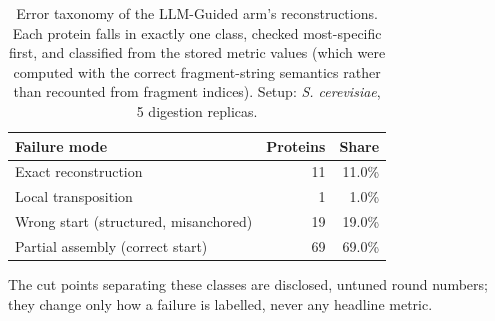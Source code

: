 \begin{table}[!tb]
  \centering
  \caption{Error taxonomy of the LLM-Guided arm's reconstructions. Each protein falls in exactly one class, checked most-specific first, and classified from the stored metric values (which were computed with the correct fragment-string semantics rather than recounted from fragment indices). Setup: \textnormal{\textnormal{\textit{S. cerevisiae}}}, 5 digestion replicas.}
  \label{tab:error_taxonomy_yeast_r5}
  \begin{tabular}{lrr}
    \toprule
    Failure mode & Proteins & Share \\
    \midrule
    Exact reconstruction & 11 & 11.0\% \\
    Local transposition & 1 & 1.0\% \\
    Wrong start (structured, misanchored) & 19 & 19.0\% \\
    Partial assembly (correct start) & 69 & 69.0\% \\
    \bottomrule
  \end{tabular}
  \par\smallskip\footnotesize{The cut points separating these classes are disclosed, untuned round numbers; they change only how a failure is labelled, never any headline metric.}
\end{table}
